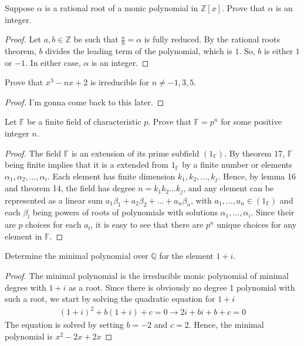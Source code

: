 \documentclass[10pt]{article}
\newcommand{\Z}{\mathbb{Z}}
\newcommand{\Q}{\mathbb{Q}}
\newenvironment{problem}[2][Problem]{\begin{trivlist}
		\item[\hskip \labelsep {\bfseries #1}\hskip \labelsep {\bfseries #2.}]}{\end{trivlist}}
\begin{document}
	\begin{problem}{1.5}
		Suppose $\alpha$ is a rational root of a monic polynomial in $\Z[x]$. Prove that $\alpha$ is an integer.
		\begin{proof}
		Let $a,b \in \Z$ be such that $\frac{a}{b} =\alpha$ is fully reduced. By the rational roots theorem, $b$ divides the leading term of the polynomial, which is $1$. So, $b$ is either $1$ or $-1$. In either case, $\alpha$ is an integer.
		\end{proof}
	\end{problem}
	
	\begin{problem}{1.7}
		Prove that $x^3 - nx + 2$ is irreducible for $n \neq  -1, 3, 5$.
		\begin{proof}
			I'm gonna come back to this later.
		\end{proof}
	\end{problem}
	
	\begin{problem}{2.1}
		Let $\mathbb{F}$ be a finite field of characteristic $p$. Prove that $\mathbb{F} = p^n$ for some positive integer $n$.
		\begin{proof}
			The field $\mathbb{F}$ is an extension of its prime subfield $(1_\mathbb{F})$. By theorem 17, $\mathbb{F}$ being finite implies that it is a extended from $1_\mathbb{F}$ by a finite number or elements $\alpha_1, \alpha_2, ..., \alpha_i$. Each element has finite dimension $k_1, k_2, ..., k_j$. Hence, by lemma 16 and theorem 14, the field has degree $n=k_1k_2...k_j$, and any element can be represented as a linear sum $a_1\beta_1 + a_2\beta_2 + ... + a_{n}\beta_{n}$, with $a_1, ..., a_n \in (1_\mathbb{F})$ and each $\beta_l$ being powers of roots of polynomials with solutions $\alpha_1, ..., \alpha_i$. Since their are $p$ choices for each $a_l$, it is easy to see that there are $p^n$ unique choices for any element in $\mathbb{F}$.
		\end{proof}
	\end{problem}
	
	\begin{problem}{2.3}
		Determine the minimal polynomial over $\Q$ for the element $1 + i$.
		\begin{proof}
			The minimal polynomial is the irreducible monic polynomial of minimal degree with $1+i$ as a root. Since there is obviously no degree 1 polynomial with such a root, we start by solving the quadratic equation for $1+i$
			\begin{align*}
				(1+i)^2 + b(1+i) + c = 0 \rightarrow 2i + bi + b + c = 0
			\end{align*}
			The equation is solved by setting $b=-2$ and $c=2$. Hence, the minimal polynomial is $x^2 - 2x + 2x$
		\end{proof}
	\end{problem}
	
\end{document}
